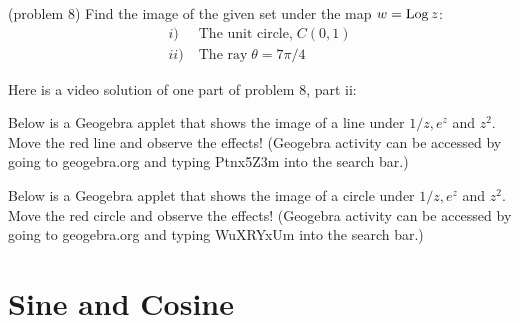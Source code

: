 \documentclass[handout]{ximera}
\begin{document}
\begin{example}[example 8]
\begin{image}
\end{image}


\end{example}

\begin{problem}(problem 8)
Find the image of the given set under the map $w = \operatorname{Log} z$:
\begin{align*}
i)\; & \mbox{The unit circle,}\; C(0,1) \\
ii)\; & \mbox{The ray}\; \theta = 7\pi/4
\end{align*}
\end{problem}

Here is a video solution of one part of problem 8, part ii:\\
\begin{foldable}
\end{foldable}

Below is a Geogebra applet that shows the image of a line under $1/z, e^z$ and $z^2$.  
Move the red line and observe the effects! 
(Geogebra activity can be accessed by going to geogebra.org and typing
Ptnx5Z3m into the search bar.)
\begin{center}
\end{center}


Below is a Geogebra applet that shows the image of a circle under $1/z, e^z$ and $z^2$.  
Move the red circle and observe the effects! 
(Geogebra activity can be accessed by going to geogebra.org and typing WuXRYxUm into the search bar.)
\begin{center}
\end{center}




\section{Sine and Cosine}
\end{document}
